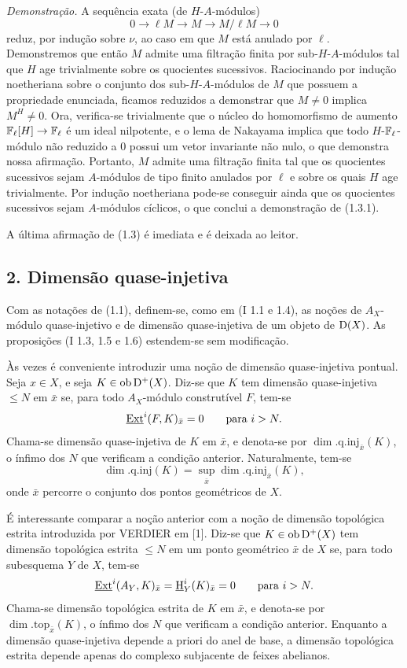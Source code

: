 \emph{Demonstração.} A sequência exata (de $H$-$A$-módulos)
\[
        0\longrightarrow \ell M\longrightarrow M\longrightarrow M/\ell M\longrightarrow 0
\]
reduz, por indução sobre $\nu$, ao caso em que $M$ está anulado por $\ell$. Demonstremos que então $M$ admite uma filtração finita por sub-$H$-$A$-módulos tal que $H$ age trivialmente sobre os quocientes sucessivos. Raciocinando por indução noetheriana sobre o conjunto dos sub-$H$-$A$-módulos de $M$ que possuem a propriedade enunciada, ficamos reduzidos a demonstrar que $M\neq0$ implica $M^H\neq0$. Ora, verifica-se trivialmente que o núcleo do homomorfismo de aumento $\mathbb{F}_\ell[H]\to\mathbb{F}_\ell$ é um ideal nilpotente, e o lema de Nakayama implica que todo $H$-$\mathbb{F}_\ell$-módulo não reduzido a $0$ possui um vetor invariante não nulo, o que demonstra nossa afirmação. Portanto, $M$ admite uma filtração finita tal que os quocientes sucessivos sejam $A$-módulos de tipo finito anulados por $\ell$ e sobre os quais $H$ age trivialmente. Por indução noetheriana pode-se conseguir ainda que os quocientes sucessivos sejam $A$-módulos cíclicos, o que conclui a demonstração de (1.3.1).

A última afirmação de (1.3) é imediata e é deixada ao leitor.

\subsection*{2. Dimensão quase-injetiva}

Com as notações de (1.1), definem-se, como em (I 1.1 e 1.4), as noções de $A_X$-módulo quase-injetivo e de dimensão quase-injetiva de um objeto de $\mathrm{D}(X)$. As proposições (I 1.3, 1.5 e 1.6) estendem-se sem modificação.

Às vezes é conveniente introduzir uma noção de dimensão quase-injetiva pontual. Seja $x\in X$, e seja $K\in\operatorname{ob} \mathrm{D}^+(X)$. Diz-se que $K$ tem dimensão quase-injetiva $\leq N$ em $\bar{x}$ se, para todo $A_X$-módulo construtível $F$, tem-se
\[
        \underline{\operatorname{Ext}}^{i}(F,K)_{\bar{x}}=0\qquad\hbox{para }i>N.
\]
Chama-se dimensão quase-injetiva de $K$ em $\bar{x}$, e denota-se por $\dim.\mathrm{q.inj}_{\bar{x}}(K)$, o ínfimo dos $N$ que verificam a condição anterior. Naturalmente, tem-se
\[
        \dim.\mathrm{q.inj}(K)=\sup_{\bar{x}}\dim.\mathrm{q.inj}_{\bar{x}}(K),
\]
onde $\bar{x}$ percorre o conjunto dos pontos geométricos de $X$.

É interessante comparar a noção anterior com a noção de dimensão topológica estrita introduzida por VERDIER em [1]. Diz-se que $K\in\operatorname{ob} \mathrm{D}^+(X)$ tem dimensão topológica estrita $\leq N$ em um ponto geométrico $\bar{x}$ de $X$ se, para todo subesquema $Y$ de $X$, tem-se
\[
        \underline{\operatorname{Ext}}^{i}(A_Y,K)_{\bar{x}}=\underline{\mathrm H}^i_Y(K)_{\bar{x}}=0\qquad\hbox{para }i>N.
\]
Chama-se dimensão topológica estrita de $K$ em $\bar{x}$, e denota-se por $\dim.\mathrm{top}_{\bar{x}}(K)$, o ínfimo dos $N$ que verificam a condição anterior. Enquanto a dimensão quase-injetiva depende a priori do anel de base, a dimensão topológica estrita depende apenas do complexo subjacente de feixes abelianos.

